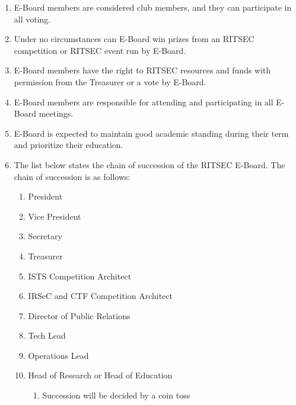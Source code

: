 


\begin{enumerate}
	\item E-Board members are considered club members, and they can participate in all
	      voting.
	\item Under no circumstances can E-Board win prizes from an RITSEC competition or
	      RITSEC event run by E-Board.
	\item E-Board members have the right to RITSEC resources and funds with permission
	      from the Treasurer or a vote by E-Board.
	\item E-Board members are responsible for attending and participating in all E-Board
	      meetings.
        \item E-Board is expected to maintain good academic standing during their term and prioritize their education. 
	\item The list below states the chain of succession of the RITSEC E-Board. The chain
	      of succession is as follows:
	      \begin{enumerate}
		      \item President
		      \item Vice President
		      \item Secretary
		      \item Treasurer
		      \item ISTS Competition Architect
		      \item IRSeC and CTF Competition Architect
		      \item Director of Public Relations
		      \item Tech Lead
		      \item Operations Lead
		      \item Head of Research or Head of Education
		            \begin{enumerate}
			            \item Succession will be decided by a coin toss
		            \end{enumerate}
	      \end{enumerate}
\end{enumerate}

